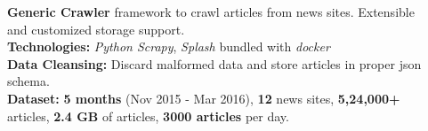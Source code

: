 \documentclass[20pt, a1paper, landscape, margin=0mm, innermargin=15mm,
blockverticalspace=15mm, colspace=15mm, subcolspace=8mm]{tikzposter}
\begin{document}
\begin{columns}
\begin{subcolumns}
{%
 \textbf{Generic Crawler} framework to crawl articles from news sites. Extensible and customized storage support.\\
 \textbf{Technologies:} \textit{Python Scrapy}, \textit{Splash} bundled with \textit{docker}\\
 \textbf{Data Cleansing:} Discard malformed data and store articles in proper json schema.\\
 \textbf{Dataset:} \textbf{5 months} (Nov 2015 - Mar 2016), \textbf{12} news sites, \textbf{5,24,000+} articles, \textbf{2.4 GB} of articles, \textbf{3000 articles} per day. \\
}

{ %


}

\end{subcolumns}



\begin{subcolumns}


\end{subcolumns}
\end{columns}
\end{document}
